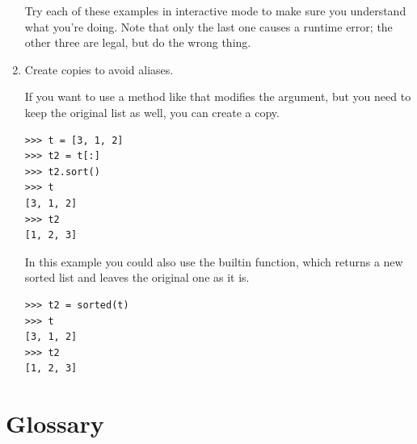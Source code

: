 \begin{enumerate}
Try each of these examples in interactive mode to make sure you understand what you're doing. Note that only the last one causes a runtime error; the other three are legal, but do the wrong thing.


\item Create copies to avoid aliases.

If you want to use a method like  that modifies the argument, but you need to keep the original list as well, you can create a copy.

\begin{Verbatim}[frame=single]
>>> t = [3, 1, 2]
>>> t2 = t[:]
>>> t2.sort()
>>> t
[3, 1, 2]
>>> t2
[1, 2, 3]
\end{Verbatim}

In this example you could also use the  builtin function, which returns a new sorted list and leaves the original one as it is.

\begin{Verbatim}[frame=single]
>>> t2 = sorted(t)
>>> t
[3, 1, 2]
>>> t2
[1, 2, 3]
\end{Verbatim}

\end{enumerate}



\section{Glossary}

